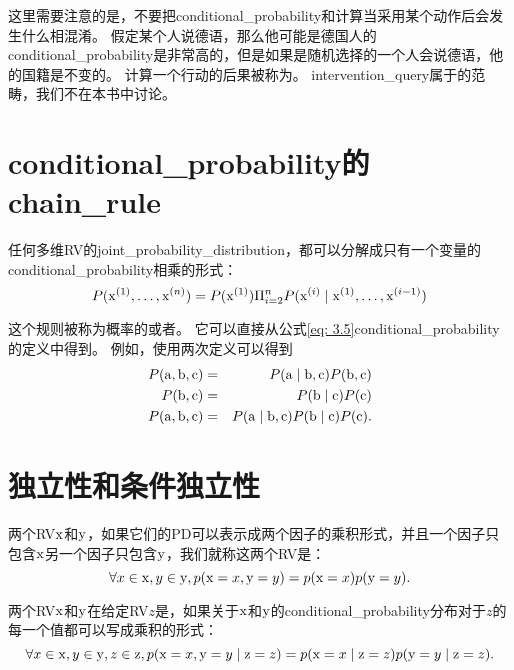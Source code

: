 这里需要注意的是，不要把\gls{conditional_probability}和计算当采用某个动作后会发生什么相混淆。
假定某个人说德语，那么他可能是德国人的\gls{conditional_probability}是非常高的，但是如果是随机选择的一个人会说德语，他的国籍是不变的。
计算一个行动的后果被称为。
\gls{intervention_query}属于的范畴，我们不在本书中讨论。

\section{\gls{conditional_probability}的\gls{chain_rule}}
\label{sec:the_chain_rule_of_conditional_probabilities}

任何多维\gls{RV}的\gls{joint_probability_distribution}，都可以分解成只有一个变量的\gls{conditional_probability}相乘的形式：
\begin{equation}
P(\mathrm{x}^{(1)}, \ldots, \mathrm{x}^{(n)}) = P(\mathrm{x}^{(1)}) \Pi_{i=2}^n P(\mathrm{x}^{(i)} \mid \mathrm{x}^{(1)}, \ldots, \mathrm{x}^{(i-1)})
\end{equation}


这个规则被称为概率的或者。
它可以直接从公式\ref{eq: 3.5}\gls{conditional_probability}的定义中得到。
例如，使用两次定义可以得到
\begin{eqnarray*}
P(\mathrm{a}, \mathrm{b}, \mathrm{c}) &=& P(\mathrm{a} \mid \mathrm{b}, \mathrm{c}) P(\mathrm{b}, \mathrm{c})\\
P(\mathrm{b}, \mathrm{c}) &=& P(\mathrm{b} \mid \mathrm{c}) P(\mathrm{c})\\
P(\mathrm{a}, \mathrm{b}, \mathrm{c}) &=& P(\mathrm{a} \mid \mathrm{b}, \mathrm{c}) P(\mathrm{b} \mid \mathrm{c}) P(\mathrm{c}).
\end{eqnarray*}

\section{独立性和条件独立性}
\label{sec:independence_and_conditional_independence}

两个\gls{RV}$\mathrm{x}$和$\mathrm{y}$，如果它们的\gls{PD}可以表示成两个因子的乘积形式，并且一个因子只包含$\mathrm{x}$另一个因子只包含$\mathrm{y}$，我们就称这两个\gls{RV}是：
\begin{equation}
\forall x \in \mathrm{x}, y \in \mathrm{y}, p(\mathrm{x} = x, \mathrm{y} = y) = p(\mathrm{x} = x)p(\mathrm{y} = y).
\end{equation}

两个\gls{RV}$\mathrm{x}$和$\mathrm{y}$在给定\gls{RV}$z$是，如果关于$\mathrm{x}$和$\mathrm{y}$的\gls{conditional_probability}分布对于$z$的每一个值都可以写成乘积的形式：
\begin{equation}
\forall x \in \mathrm{x}, y \in \mathrm{y}, z \in \mathrm{z}, p( \mathrm{x}=x, \mathrm{y}=y \mid \mathrm{z}=z) =
p(\mathrm{x} = x \mid \mathrm{z} = z) p(\mathrm{y} = y \mid \mathrm{z} = z).
\end{equation}

